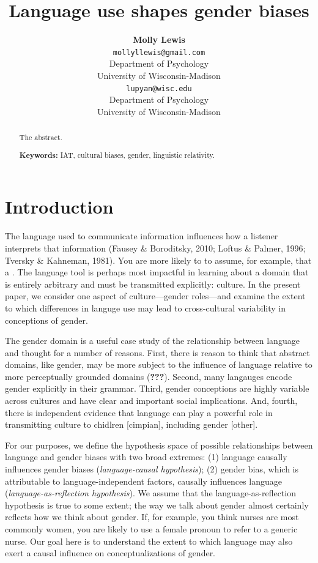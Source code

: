 \documentclass[10pt, letterpaper]{article}
\title{Language use shapes gender biases}
\author{{\large \bf Molly Lewis} \\ \texttt{mollyllewis@gmail.com} \\ Department of Psychology  \\ University of Wisconsin-Madison \And {\large \bf Gary Lupyan} \\ \texttt{lupyan@wisc.edu} \\ Department of Psychology  \\ University of Wisconsin-Madison}
\begin{document}
\maketitle

\begin{abstract}
The abstract.

\textbf{Keywords:}
IAT, cultural biases, gender, linguistic relativity.
\end{abstract}

\section{Introduction}\label{introduction}

The language used to communicate information influences how a listener
interprets that information (Fausey \& Boroditsky, 2010; Loftus \&
Palmer, 1996; Tversky \& Kahneman, 1981). You are more likely to to
assume, for example, that a . The language tool is perhaps most
impactful in learning about a domain that is entirely arbitrary and must
be transmitted explicitly: culture. In the present paper, we consider
one aspect of culture---gender roles---and examine the extent to which
differences in languge use may lead to cross-cultural variability in
conceptions of gender.

The gender domain is a useful case study of the relationship between
language and thought for a number of reasons. First, there is reason to
think that abstract domains, like gender, may be more subject to the
influence of language relative to more perceptually grounded domains
({\textbf{???}}). Second, many langauges encode gender explicitly in
their grammar. Third, gender conceptions are highly variable across
cultures and have clear and important social implications. And, fourth,
there is independent evidence that language can play a powerful role in
transmitting culture to chidlren {[}cimpian{]}, including gender
{[}other{]}.

For our purposes, we define the hypothesis space of possible
relationships between language and gender biases with two broad
extremes: (1) language causally influences gender biases
(\emph{language-causal hypothesis}); (2) gender bias, which is
attributable to language-independent factors, causally influences
language (\emph{language-as-reflection hypothesis}). We assume that the
language-as-reflection hypothesis is true to some extent; the way we
talk about gender almost certainly reflects how we think about gender.
If, for example, you think nurses are most commonly women, you are
likely to use a female pronoun to refer to a generic nurse. Our goal
here is to understand the extent to which language may also exert a
causal influence on conceptualizations of gender.
\end{document}
